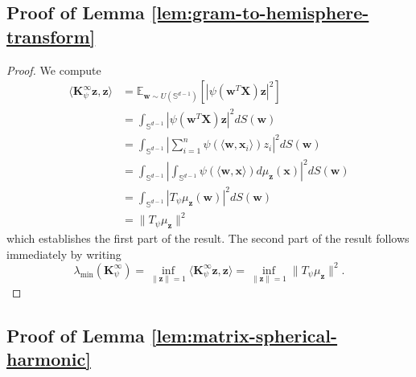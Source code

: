 \documentclass{article}
\theoremstyle{definition}
\newcommand{\E}{\mathbb{E}}
\renewcommand{\S}{\mathbb{S}}
\def\vw{{\bm{w}}}
\def\vx{{\bm{x}}}
\def\vz{{\bm{z}}}
\def\mK{{\bm{K}}}
\def\mX{{\bm{X}}}
\begin{document}
\subsection{Proof of Lemma \ref{lem:gram-to-hemisphere-transform}} \label{app:gram-to-hemisphere-transform}


\lemmaGradToHemi*
\begin{proof}
    We compute
    \begin{align*}
        \langle \mK_{\psi}^{\infty}\vz, \vz \rangle &= \E_{\vw \sim U(\S^{d - 1})}\left[\left| \psi\left(\vw^T \mX \right) \vz \right|^2 \right]\\
        &= \int_{\S^{d - 1}} \left| \psi\left(\vw^T \mX\right) \vz \right|^2 dS(\vw)\\
        &= \int_{\S^{d - 1}}\left|\sum_{i = 1}^n \psi(\langle \vw, \vx_i \rangle) z_i\right|^2 dS(\vw)\\
        &= \int_{\S^{d - 1}}\left|\int_{\S^{d - 1}} \psi(\langle \vw, \vx \rangle) d\mu_{\vz}(\vx) \right|^2dS(\vw)\\
        &= \int_{\S^{d - 1}} \left| T_{\psi} \mu_{\vz}(\vw)\right|^2 dS(\vw)\\
        &= \|T_{\psi}\mu_{\vz}\|^2
    \end{align*}
    which establishes the first part of the result. The second part of the result follows immediately by writing
    \[\lambda_{\min}(\mK_{\psi}^{\infty}) = \inf_{\|\vz\| = 1} \langle \mK_{\psi}^{\infty}\vz, \vz \rangle = \inf_{\|\vz\| = 1} \|T_{\psi}\mu_{\vz}\|^2. \]
\end{proof}

\subsection{Proof of Lemma \ref{lem:matrix-spherical-harmonic}} \label{app:matrix-spherical-harmonic}

\lemmaMatrixSphericalHarmonic*
\end{document}
